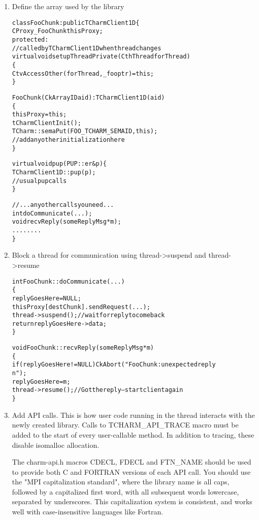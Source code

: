 \documentclass[10pt]{article}
\begin{document}
\begin{enumerate}
\item Define the array used by the library

\begin{alltt}
class FooChunk: public TCharmClient1D \{
   CProxy\_FooChunk thisProxy;
protected:
   //called by TCharmClient1D when thread changes
   virtual void setupThreadPrivate(CthThread forThread)
   \{
      CtvAccessOther(forThread, \_fooptr) = this;
   \}
   
   FooChunk(CkArrayID aid):TCharmClient1D(aid)
   \{
      thisProxy = this;
      tCharmClientInit();
      TCharm::semaPut(FOO_TCHARM_SEMAID,this);
      //add any other initialization here
   \}

   virtual void pup(PUP::er &p) \{
     TCharmClient1D::pup(p);
     //usual pup calls
   \}
   
   // ...any other calls you need...
   int doCommunicate(...);
   void recvReply(someReplyMsg *m);
   ........
\}
\end{alltt}


\item Block a thread for communication using thread->suspend and
thread->resume

\begin{alltt}
int FooChunk::doCommunicate(...)
\{
   replyGoesHere = NULL;
   thisProxy[destChunk].sendRequest(...);
   thread->suspend(); //wait for reply to come back
   return replyGoesHere->data;
\}

void FooChunk::recvReply(someReplyMsg *m)
\{
  if(replyGoesHere!=NULL) CkAbort("FooChunk: unexpected reply\\n");
  replyGoesHere = m;
  thread->resume(); //Got the reply -- start client again
\}
\end{alltt}


\item Add API calls. This is how user code running in the thread interacts
with the newly created library. Calls to TCHARM\_API\_TRACE macro must be 
added to the start of every user-callable method. In addition to tracing,
these disable isomalloc allocation. 

The charm-api.h macros CDECL, FDECL and
FTN\_NAME should be used to provide both C and FORTRAN versions of each 
API call.  You should use the "MPI capitalization standard", where the library
name is all caps, followed by a capitalized first word, with all subsequent 
words lowercase, separated by underscores.  This capitalization system is 
consistent, and works well with case-insensitive languages like Fortran.


\end{enumerate}
\end{document}
